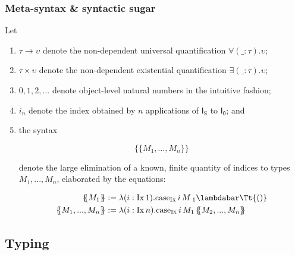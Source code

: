 \documentclass[authoryear,acmsmall,screen]{acmart}
\newcommand\Absurd{\ensuremath{\lambdabar\mathrm{\Tt{()}}}}
\newcommand\IX{\textsc{Ix}}
\newcommand\FZero{\mathsf{I_0}}
\newcommand\Suc{\mathrm{S}}
\newcommand\FSuc{\mathsf{I_{\Suc}}}
\newcommand\Ix[1]{\mathrm{Ix} \, #1}
\renewcommand\Case{\mathrm{case}}
\newcommand\CaseIx[3]{\ensuremath{\Case_{\mathrm{\IX{}}} \, #1 \, #2 \, #3 }}
\newcommand\Felim[1]{\{\!\!\{#1\}\!\!\}}
\begin{document}
\subsubsection{Meta-syntax \& syntactic sugar}

Let
\begin{enumerate}
\item $\tau \to \upsilon$ denote the non-dependent universal quantification $\forall (\_ : \tau). \upsilon$;
\item $\tau \times \upsilon$ denote the non-dependent existential quantification $\exists (\_ : \tau). \upsilon$;
\item $0,1,2,...$ denote object-level natural numbers in the intuitive fashion; \item $i_{n}$ denote the index obtained by $n$ applications of $\FSuc$ to $\FZero$; and
\item the syntax 

\[
\Felim {M_1,...,M_n}
\]

denote the large elimination of a known, finite quantity of indices to types $M_{1},...,M_{n}$, elaborated by the equations:

\begin{align*}
  \Felim{M_{1}} &:= \lambda (i : \Ix{1}). \CaseIx i M_{1} \Absurd \\
  \Felim{M_{1},...,M_{n}} &:= \lambda (i : \Ix{n}). \CaseIx i {M_{1}} \Felim{M_{2},...,M_{n}}
\end{align*}
\end{enumerate}



\subsection{Typing}
\end{document}

